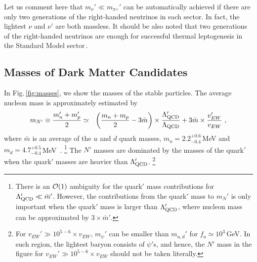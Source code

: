 \documentclass[aps,amsmath,preprint,epsf,superscriptaddress,nofootinbib,notitlepage]{revtex4-1}
\begin{document}
Let us comment here that  $m_\nu' \ll m_{\pi^\pm}'$ can be automatically achieved if there are only two generations of the right-handed neutrinos in each sector. 
In fact, the lightest $\nu$ and $\nu'$ are both massless.
It should be also noted that two generations of the right-handed neutrinos are enough for successful thermal leptogenesis 
in the Standard Model sector\,\cite{Frampton:2002qc,Raidal:2002xf,Ibarra:2003up,Harigaya:2012bw}. 

\subsection{Masses of Dark Matter Candidates}
In Fig.\,\ref{fig:masses}, we show the masses of the stable particles.
The average nucleon mass is approximately estimated by
\begin{eqnarray}
m_{N'} \equiv \frac{m_n' + m_p'}{2} &\simeq& \left(\frac{m_n + m_p}{2} - 3 \bar{m}\right) \times \frac{\Lambda_{\rm QCD}'}{\Lambda_{\rm QCD}}  + 3 \bar{m} \times \frac{v_{EW}'} {v_{EW}} \ , 
\end{eqnarray}
where $\bar{m}$ is an average of the $u$ and $d$ quark masses,  $m_u = 2.2^{+0.6}_{-0.4}$\,MeV
and $m_d = 4.7^{+0.5}_{-0.4}$\,MeV~\cite{Olive:2016xmw}.%
\footnote{There is an ${\cal O}(1)$ ambiguity for the quark$'$ mass contributions for $\Lambda_{\rm QCD}' \ll \bar{m}'$.
However, the contributions from the quark$'$ mass to $m_N'$ is only important when the quark$'$ mass
is larger than $\Lambda_{\rm QCD}'$, where nucleon mass can be approximated by $3\times\bar{m}'$.}
The $N'$ masses are dominated by the masses of the quark$'$ 
when the quark$'$ masses are heavier than $\Lambda_{\rm QCD}'$.%
\footnote{For $v_{EW}' \gg 10^{5-6}\times v_{EW}$,  $m_\psi'$ can be smaller than $m_{u,d}'$ for $f_a \simeq 10^3$\,GeV. 
In such region, the lightest baryon consists of $\psi'$s, and hence, 
the $N'$ mass in the figure for $v_{EW}' \gg 10^{5-6}\times v_{EW}$ should not  be taken literally.
}
\end{document}
